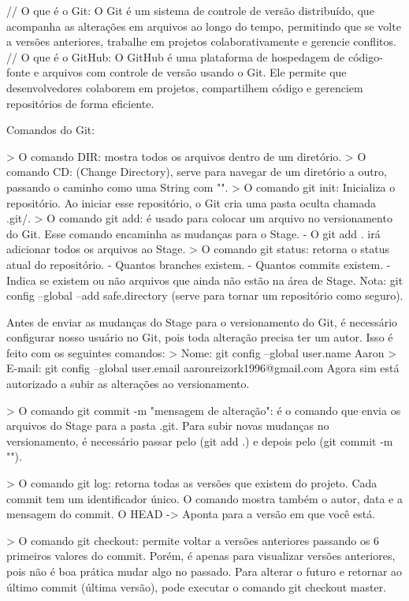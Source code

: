 // O que é o Git:
O Git é um sistema de controle de versão distribuído, que acompanha as alterações em arquivos ao longo do tempo, 
permitindo que se volte a versões anteriores, trabalhe em projetos colaborativamente e gerencie conflitos.
// O que é o GitHub:
O GitHub é uma plataforma de hospedagem de código-fonte e arquivos com controle de versão usando o Git. 
Ele permite que desenvolvedores colaborem em projetos, compartilhem código e gerenciem repositórios de forma eficiente.

Comandos do Git:

> O comando DIR: mostra todos os arquivos dentro de um diretório.
> O comando CD: (Change Directory), serve para navegar de um diretório a outro, passando o caminho como uma String com "".
> O comando git init: Inicializa o repositório. Ao iniciar esse repositório, o Git cria uma pasta oculta chamada .git/.
> O comando git add: é usado para colocar um arquivo no versionamento do Git. Esse comando encaminha as mudanças para o Stage.
    - O git add . irá adicionar todos os arquivos ao Stage.
> O comando git status: retorna o status atual do repositório. 
    - Quantos branches existem.
    - Quantos commits existem.
    - Indica se existem ou não arquivos que ainda não estão na área de Stage.
Nota: git config --global --add safe.directory (serve para tornar um repositório como seguro).

Antes de enviar as mudanças do Stage para o versionamento do Git, é necessário configurar nosso
usuário no Git, pois toda alteração precisa ter um autor. Isso é feito com os seguintes comandos:
> Nome: git config --global user.name Aaron
> E-mail: git config --global user.email aaronreizork1996@gmail.com
Agora sim está autorizado a subir as alterações ao versionamento.

> O comando git commit -m "mensagem de alteração": é o comando que envia os arquivos do Stage para a pasta .git.
Para subir novas mudanças no versionamento, é necessário passar pelo (git add .) e depois pelo (git commit -m "").

> O comando git log: retorna todas as versões que existem do projeto. Cada commit tem um identificador
único. O comando mostra também o autor, data e a mensagem do commit. 
O HEAD -> Aponta para a versão em que você está.

> O comando git checkout: permite voltar a versões anteriores passando os 6 primeiros valores do commit.
Porém, é apenas para visualizar versões anteriores, pois não é boa prática mudar algo no passado. Para alterar o futuro e retornar ao último commit (última versão), pode executar o 
comando git checkout master.

